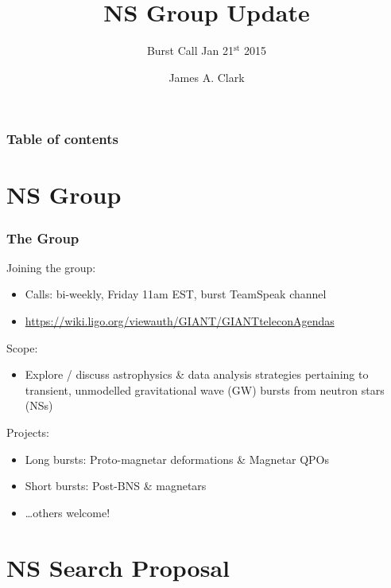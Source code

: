 \documentclass{beamer}
\def\gw#1{gravitational wave#1 (GW#1)\gdef\gw{GW}}
\def\ns#1{neutron star#1 (NS#1)\gdef\ns{NS}}
\begin{document}
\title{NS Group Update}
\subtitle{Burst Call Jan 21$^{\text{st}}$ 2015}  
\author{James A. Clark}
\date{} 

\begin{frame}[plain]
\titlepage
\end{frame}

\begin{frame}\frametitle{Table of contents}\tableofcontents
\end{frame} 

\section{NS Group}

\begin{frame}
    \frametitle{The Group}
    Joining the group:
    \begin{itemize}
        \item Calls: bi-weekly, Friday 11am EST, burst TeamSpeak channel
        \item
            {\small\href{https://wiki.ligo.org/viewauth/GIANT/GIANTteleconAgendas}
            {https://wiki.ligo.org/viewauth/GIANT/GIANTteleconAgendas}}
    \end{itemize}
    Scope:
    \begin{itemize}
        \item Explore / discuss astrophysics \& data analysis strategies
            pertaining to transient, unmodelled \gw{} bursts from \ns{s}
    \end{itemize}
    Projects:
    \begin{itemize}
        \item Long bursts: Proto-magnetar deformations \& Magnetar QPOs
        \item Short bursts: Post-BNS \& magnetars
        \item \dots others welcome!
    \end{itemize}
\end{frame}

\section{NS Search Proposal}
\end{document}
